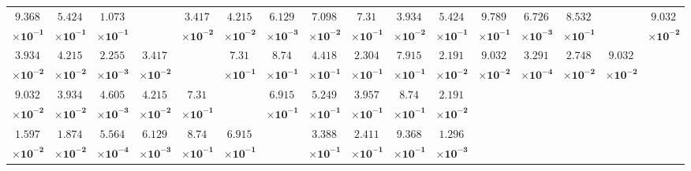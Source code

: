 \begin{table}[!ht]
{\begin{tabular}{|c|c|c|c|c|c|c|c|c|c|c|c|c|c|c|c|}
			$\mathbf{9.368}$ & $\mathbf{5.424}$ & $\mathbf{1.073}$ & \multirow{2}{*}{} & $\mathbf{3.417}$ & $\mathbf{4.215}$ & $\mathbf{6.129}$ & $\mathbf{7.098}$ & $\mathbf{7.31}$ & $\mathbf{3.934}$ & $\mathbf{5.424}$ & $\mathbf{9.789}$ & $\mathbf{6.726}$ & $\mathbf{8.532}$ & \multirow{2}{*}{} & $\mathbf{9.032}$\\ 
			$\mathbf{\times 10^{-1}}$ & $\mathbf{\times 10^{-1}}$ & $\mathbf{\times 10^{-1}}$ & & $\mathbf{\times 10^{-2}}$ & $\mathbf{\times 10^{-2}}$ & $\mathbf{\times 10^{-3}}$ & $\mathbf{\times 10^{-2}}$ & $\mathbf{\times 10^{-1}}$ & $\mathbf{\times 10^{-2}}$ & $\mathbf{\times 10^{-1}}$ & $\mathbf{\times 10^{-1}}$ & $\mathbf{\times 10^{-3}}$ & $\mathbf{\times 10^{-1}}$ & & $\mathbf{\times 10^{-2}}$\\ \cline{1-16}
			$\mathbf{3.934}$ & $\mathbf{4.215}$ & $\mathbf{2.255}$ & $\mathbf{3.417}$ & \multirow{2}{*}{} & $\mathbf{7.31}$ & $\mathbf{8.74}$ & $\mathbf{4.418}$ & $\mathbf{2.304}$ & $\mathbf{7.915}$ & $\mathbf{2.191}$ & $\mathbf{9.032}$ & $\mathbf{3.291}$ & $\mathbf{2.748}$ & $\mathbf{9.032}$ & \multirow{2}{*}{} \\ 
			$\mathbf{\times 10^{-2}}$ & $\mathbf{\times 10^{-2}}$ & $\mathbf{\times 10^{-3}}$ & $\mathbf{\times 10^{-2}}$ & & $\mathbf{\times 10^{-1}}$ & $\mathbf{\times 10^{-1}}$ & $\mathbf{\times 10^{-1}}$ & $\mathbf{\times 10^{-1}}$ & $\mathbf{\times 10^{-1}}$ & $\mathbf{\times 10^{-2}}$ & $\mathbf{\times 10^{-2}}$ & $\mathbf{\times 10^{-4}}$ & $\mathbf{\times 10^{-2}}$ & $\mathbf{\times 10^{-2}}$ & \\ \cline{1-16}
			$\mathbf{9.032}$ & $\mathbf{3.934}$ & $\mathbf{4.605}$ & $\mathbf{4.215}$ & $\mathbf{7.31}$ & \multirow{2}{*}{} & $\mathbf{6.915}$ & $\mathbf{5.249}$ & $\mathbf{3.957}$ & $\mathbf{8.74}$ & $\mathbf{2.191}$ & \multicolumn{5}{c}{} \\ 
			$\mathbf{\times 10^{-2}}$ & $\mathbf{\times 10^{-2}}$ & $\mathbf{\times 10^{-3}}$ & $\mathbf{\times 10^{-2}}$ & $\mathbf{\times 10^{-1}}$ & & $\mathbf{\times 10^{-1}}$ & $\mathbf{\times 10^{-1}}$ & $\mathbf{\times 10^{-1}}$ & $\mathbf{\times 10^{-1}}$ & $\mathbf{\times 10^{-2}}$ & \multicolumn{5}{c}{} \\ \cline{1-11}
			$\mathbf{1.597}$ & $\mathbf{1.874}$ & $\mathbf{5.564}$ & $\mathbf{6.129}$ & $\mathbf{8.74}$ & $\mathbf{6.915}$ & \multirow{2}{*}{} & $\mathbf{3.388}$ & $\mathbf{2.411}$ & $\mathbf{9.368}$ & $\mathbf{1.296}$ & \multicolumn{5}{c}{} \\ 
			$\mathbf{\times 10^{-2}}$ & $\mathbf{\times 10^{-2}}$ & $\mathbf{\times 10^{-4}}$ & $\mathbf{\times 10^{-3}}$ & $\mathbf{\times 10^{-1}}$ & $\mathbf{\times 10^{-1}}$ & & $\mathbf{\times 10^{-1}}$ & $\mathbf{\times 10^{-1}}$ & $\mathbf{\times 10^{-1}}$ & $\mathbf{\times 10^{-3}}$ & \multicolumn{5}{c}{} \\ \cline{1-11}

\end{tabular}}
\end{table}
